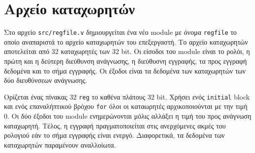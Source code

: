 \section{Αρχείο καταχωρητών}

Στο αρχείο \texttt{src/regfile.v} δημιουργείται ένα νέο module με όνομα \texttt{regfile} το οποίο αναπαριστά το αρχείο καταχωρητών του επεξεργαστή. Το αρχείο καταχωρητών αποτελείται από 32 καταχωρητές των 32 bit. Οι είσοδοι του module είναι το ρολόι, η πρώτη και η δεύτερη διεύθυνση ανάγνωσης, η διεύθυσνη εγγραφής, τα προς εγγραφή δεδομένα και το σήμα εγγραφής. Οι έξοδοι είναι τα δεδομένα των καταχωρητών των δύο διευθύνσεων ανάγνωσης.\par
Ορίζεται ένας πίνακας 32 \texttt{reg} το καθένα πλάτους 32 bit. Χρήσει ενός \texttt{initial} block και ενός επαναλήπτικού βρόχου \texttt{for} όλοι οι καταωρητές αρχικοποιούνται με την τιμή 0. Οι δύο έξοδοι του module ενημερώνονται μόλις αλλάξει η τιμή του προς ανάγνωση καταχωρητή. Τέλος, η εγγραφή πραγματοποιείται στις ανερχόμενες ακμές του ρολογιού εάν το σήμα εγγραφής είναι ενεργό. Διαφορετικά, τα δεδομένα των καταχωρητών παραμένουν αναλλοίωτα.\par